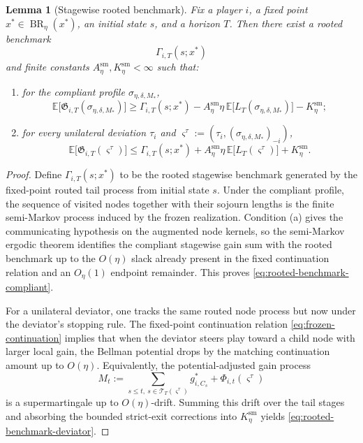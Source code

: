 \documentclass[12pt]{article}
\newtheorem{lemma}[theorem]{Lemma}
\theoremstyle{definition}
\newcommand{\E}{\mathbb{E}}
\newcommand{\1}{\mathbf{1}}
\DeclareMathOperator{\BR}{BR}
\begin{document}
\begin{lemma}[Stagewise rooted benchmark]
\label{lem:tree-telescoping}
Fix a player $i$, a fixed point $x^*\in\BR_\eta(x^*)$, an initial state $s$, and
a horizon $T$. Then there exist a rooted benchmark
\[
\Gamma_{i,T}(s;x^*)
\]
and finite constants $A_\eta^{\mathrm{sm}},K_\eta^{\mathrm{sm}}<\infty$ such that:
\begin{enumerate}[label=\textnormal{(\alph*)},leftmargin=2.8em]
\item for the compliant profile $\sigma_{\eta,\delta,M_*}$,
\begin{equation}
\label{eq:rooted-benchmark-compliant}
\E\bigl[\mathfrak G_{i,T}(\sigma_{\eta,\delta,M_*})\bigr]
\ge
\Gamma_{i,T}(s;x^*)
-
A_\eta^{\mathrm{sm}}\eta\,
\E\bigl[L_T(\sigma_{\eta,\delta,M_*})\bigr]
-
K_\eta^{\mathrm{sm}};
\end{equation}
\item for every unilateral deviation $\tau_i$ and
$\varsigma^\tau:=(\tau_i,(\sigma_{\eta,\delta,M_*})_{-i})$,
\begin{equation}
\label{eq:rooted-benchmark-deviator}
\E\bigl[\mathfrak G_{i,T}(\varsigma^\tau)\bigr]
\le
\Gamma_{i,T}(s;x^*)
+
A_\eta^{\mathrm{sm}}\eta\,
\E\bigl[L_T(\varsigma^\tau)\bigr]
+
K_\eta^{\mathrm{sm}}.
\end{equation}
\end{enumerate}
\end{lemma}

\begin{proof}
Define $\Gamma_{i,T}(s;x^*)$ to be the rooted stagewise benchmark generated by the
fixed-point routed tail process from initial state $s$. Under the compliant
profile, the sequence of visited nodes together with their sojourn lengths is the
finite semi-Markov process induced by the frozen realization. Condition
\textnormal{(a)} gives the communicating hypothesis on the augmented node kernels,
so the semi-Markov ergodic theorem identifies the compliant stagewise gain sum
with the rooted benchmark up to the $O(\eta)$ slack already present in the fixed
continuation relation and an $O_\eta(1)$ endpoint remainder. This proves
\eqref{eq:rooted-benchmark-compliant}.

For a unilateral deviator, one tracks the same routed node process but now under
the deviator's stopping rule. The fixed-point continuation relation
\eqref{eq:frozen-continuation} implies that when the deviator steers play toward a
child node with larger local gain, the Bellman potential drops by the matching
continuation amount up to $O(\eta)$. Equivalently, the potential-adjusted gain
process
\[
M_t:=\sum_{s\le t,\ s\in\mathcal T_T(\varsigma^\tau)} g_{i,C_s}^*
+
\Phi_{i,t}(\varsigma^\tau)
\]
is a supermartingale up to $O(\eta)$-drift. Summing this drift over the tail
stages and absorbing the bounded strict-exit corrections into
$K_\eta^{\mathrm{sm}}$ yields \eqref{eq:rooted-benchmark-deviator}.
\end{proof}
\end{document}
